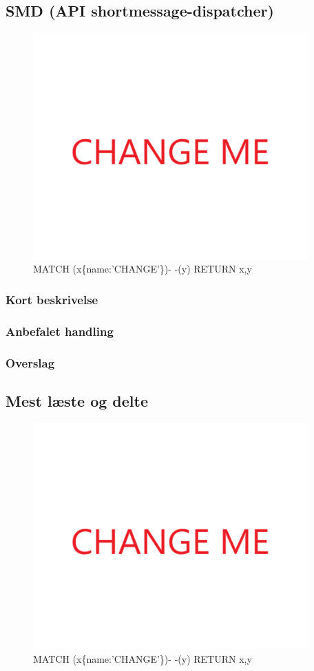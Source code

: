\documentclass{article}
\begin{document}
\subsection{SMD (API shortmessage-dispatcher)}
\begin{figure}[h]
\includegraphics[width=300pt]{CHANGE.PNG}
\caption{MATCH (x\{name:'CHANGE'\})- -(y) RETURN x,y}
\end{figure}
\subsubsection{Kort beskrivelse}
\subsubsection{Anbefalet handling}
\subsubsection{Overslag}


\subsection{Mest læste og delte}
\begin{figure}[h]
\includegraphics[width=300pt]{CHANGE.PNG}
\caption{MATCH (x\{name:'CHANGE'\})- -(y) RETURN x,y}
\end{figure}
\end{document}
